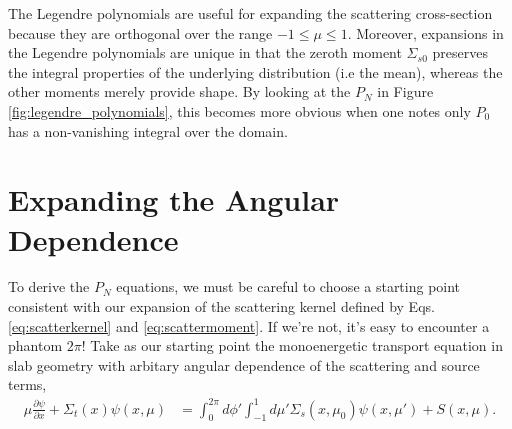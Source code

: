 The Legendre polynomials are useful for expanding the scattering cross-section because they are orthogonal over the range $-1 \leq \mu \leq 1$.  Moreover, expansions in the Legendre polynomials are unique in that the zeroth moment $\Sigma_{s0}$ preserves the integral properties of the underlying distribution (i.e the mean), whereas the other moments merely provide shape.  By looking at the $P_N$ in Figure \ref{fig:legendre_polynomials}, this becomes more obvious when one notes only $P_0$ has a non-vanishing integral over the domain.

\section*{Expanding the Angular Dependence}

To derive the $P_N$ equations, we must be careful to choose a starting point consistent with our expansion of the scattering kernel defined by Eqs. \ref{eq:scatterkernel} and \ref{eq:scattermoment}.  If we're not, it's easy to encounter a phantom $2\pi$!  Take as our starting point the monoenergetic transport equation in slab geometry with arbitary angular dependence of the scattering and source terms,
\begin{equation}
\begin{split}
 \mu \frac{\partial \psi}{\partial x} + \Sigma_t(x)\psi(x,\mu) &= \int^{2\pi}_0 d\phi' \int^1_{-1} d\mu' \Sigma_s(x,\mu_0)\psi(x,\mu')  + S(x,\mu)  .
\end{split}
 \label{eq:slabtransportequationgeneral}
\end{equation}


